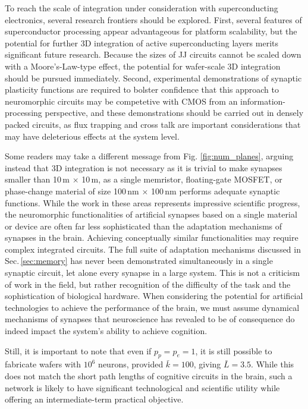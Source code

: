 \documentclass[twocolumn]{article}
\begin{document}
To reach the scale of integration under consideration with superconducting electronics, several research frontiers should be explored. First, several features of superconductor processing appear advantageous for platform scalability, but the potential for further 3D integration of active superconducting layers merits significant future research. Because the sizes of JJ circuits cannot be scaled down with a Moore's-Law-type effect, the potential for wafer-scale 3D integration should be pursued immediately. Second, experimental demonstrations of synaptic plasticity functions are required to bolster confidence that this approach to neuromorphic circuits may be competetive with CMOS from an information-processing perspective, and these demonstrations should be carried out in densely packed circuits, as flux trapping and cross talk are important considerations that may have deleterious effects at the system level. 

Some readers may take a different message from Fig. \ref{fig:num_planes}, arguing instead that 3D integration is not necessary as it is trivial to make synapses smaller than 10\,\textmu m $\times$ 10\,\textmu m, as a single memristor, floating-gate MOSFET, or phase-change material of size 100\,nm $\times$ 100\,nm performs adequate synaptic functions. While the work in these areas represents impressive scientific progress, the neuromorphic functionalities of artificial synapses based on a single material or device are often far less sophisticated than the adaptation mechanisms of synapses in the brain.  Achieving conceptually similar functionalities may require complex integrated circuits. The full suite of adaptation mechanisms discussed in Sec.\,\ref{sec:memory} has never been demonstrated simultaneously in a single synaptic circuit, let alone every synapse in a large system. This is not a criticism of work in the field, but rather recognition of the difficulty of the task and the sophistication of biological hardware. When considering the potential for artificial technologies to achieve the performance of the brain, we must assume dynamical mechanisms of synapses that neuroscience has revealed to be of consequence do indeed impact the system's ability to achieve cognition.

Still, it is important to note that even if $p_p = p_e = 1$, it is still possible to fabricate wafers with $10^6$ neurons, provided $\bar{k} = 100$, giving $\bar{L} = 3.5$. While this does not match the short path lengths of cognitive circuits in the brain, such a network is likely to have significant technological and scientific utility while offering an intermediate-term practical objective.
\end{document}
